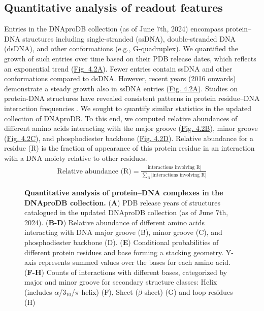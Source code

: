 \subsection{Quantitative analysis of readout features}
Entries in the DNAproDB collection (as of June 7th, 2024) encompass protein–DNA structures including single-stranded (ssDNA), double-stranded DNA (dsDNA), and other conformations (e.g., G-quadruplex). We quantified the growth of such entries over time based on their PDB release dates, which reflects an exponential trend (\hyperref[fig:dnaprodb2]{Fig. 4.2A}). Fewer entries contain ssDNA and other conformations compared to dsDNA. However, recent years (2016 onwards) demonstrate a steady growth also in ssDNA entries (\hyperref[fig:dnaprodb2]{Fig. 4.2A}). 
Studies on protein-DNA structures have revealed consistent patterns in protein residue–DNA interaction frequencies \citep{rohs2009role, Lin2019}. We sought to quantify similar statistics in the updated collection of DNAproDB. To this end, we computed relative abundances of different amino acids interacting with the major groove (\hyperref[fig:dnaprodb2]{Fig. 4.2B}), minor groove (\hyperref[fig:dnaprodb2]{Fig. 4.2C}), and phosphodiester backbone (\hyperref[fig:dnaprodb2]{Fig. 4.2D}). Relative abundance for a residue (R) is the fraction of appearance of this protein residue in an interaction with a DNA moiety relative to other residues. 
\begin{align}
\text{Relative abundance (R)} = \frac{|\text{interactions involving R}|}{\sum\limits_\text{R}|\text{interactions involving R}|}
\end{align}
\begin{center}
    \begin{figure}
        \caption[Quantitative analysis of protein–DNA complexes in the DNAproDB collection. ]{\textbf{Quantitative analysis of protein–DNA complexes in the DNAproDB collection. } ({\bf A}) PDB release years of structures catalogued in the updated DNAproDB collection (as of June 7th, 2024). ({\bf B-D})   Relative abundance of different amino acids interacting with DNA major groove (B), minor groove (C), and phosphodiester backbone (D). ({\bf E}) Conditional probabilities of different protein residues and base forming a stacking geometry. Y-axis represents summed values over the bases for each amino acid.({\bf F-H}) Counts of interactions with different bases, categorized by major and minor groove for secondary structure classes: Helix (includes $\alpha$/$3_{10}$/$\pi$-helix) (F), Sheet ($\beta$-sheet) (G) and loop residues (H) }
  \label{fig:dnaprodb2}
\end{figure}
\end{center}
